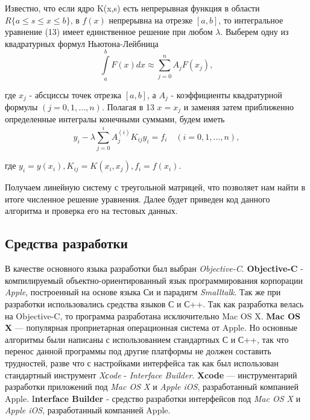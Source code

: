 Известно, что если ядро K(x,s) есть непрерывная функция в области $R\{a \leqslant s \leqslant x \leqslant b\}$, в $f(x)$ непрерывна на отрезке $[a,b]$, то интегральное  уравнение (13) имеет единственное решение при любом $\lambda$. Выберем одну из квадратурных формул Ньютона-Лейбница
\begin{equation}
\int\limits_a^b F(x) dx \approx \sum\limits_{j=0}^n A_j F(x_j),
\end{equation}

где $x_j$ - абсциссы точек отрезка $[a, b]$, а $A_j$ - коэффициенты квадратурной формулы $(j = 0, 1, ..., n)$. Полагая в 13 $x = x_j$ и заменяя затем приближенно определенные интегралы конечными суммами, будем иметь
\begin{equation}
y_i - \lambda \sum\limits_{j=0}^i A_j^{(i)} K_{ij} y_i = f_i \quad (i = 0, 1, ..., n),
\end{equation}

где $y_i = y(x_i), K_{ij} = K(x_i, x_j), f_i = f(x_i)$.

Получаем линейную систему с треугольной матрицей, что позволяет нам найти в итоге численное решение уравнения. Далее будет приведен код данного алгоритма и проверка его на тестовых данных.
\begin{center}
\item\subsection{Средства разработки}
\end{center}
В качестве основного языка разработки был выбран \textit{Objective-C}. {\bfseries Objective-C} - компилируемый объектно-ориентированный язык программирования корпорации \textit{Apple}, построенный на основе языка Си и парадигм \textit{Smalltalk}. Так же при разработки использовались средства языков С и С++. Так как разработка велась на Objective-C, то программа разработана исключительно Mac OS X. {\bfseries Mac OS X} — популярная проприетарная операционная система от Apple. Но основные алгоритмы были написаны с использованием стандартных С и С++, так что перенос данной программы под другие платформы не должен составить трудностей, разве что с настройками интерфейса так как был использован стандартный инструмент \textit{Xсode} - \textit{Interface Builder}. {\bfseries Xcode} — инструментарий разработки приложений под \textit{Mac OS X} и \textit{Apple iOS}, разработанный компанией Apple. {I\bfseries nterface Builder} - средство разработки  интерфейсов под \textit{Mac OS X} и \textit{Apple iOS}, разработанный компанией Apple.

